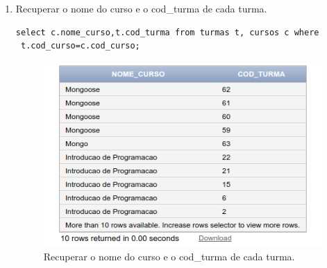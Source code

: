 \documentclass[
article,			%
11pt,				%
oneside,			%
a4paper,			%
english,			%
brazil,				%
sumario=tradicional
]{abntex2}
\begin{document}
\begin{enumerate}
	 	
	 	 	
	 	\item  Recuperar o nome do curso e o cod\_turma de
	 	cada turma.
	 	\begin{verbatim}
select c.nome_curso,t.cod_turma from turmas t, cursos c where
 t.cod_curso=c.cod_curso;
	 	\end{verbatim}
	 	\begin{center}
	 		\begin{figure}[H]
	 			\centering
	 			\includegraphics[scale=0.5]{./at-08.png}
	 			\caption{Recuperar o nome do curso e o cod\_turma de
	 				cada turma.}
	 			\label{rota-1}
	 		\end{figure}
	 	\end{center}
	 	

\end{enumerate}
\end{document}

